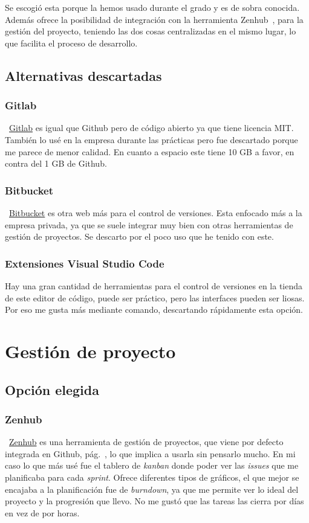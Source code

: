 Se escogió esta porque la hemos usado durante el grado y es de sobra conocida. Además ofrece la posibilidad de integración con la herramienta Zenhub~\pageref{zenhub}, para la gestión del proyecto, teniendo las dos cosas centralizadas en el mismo lugar, lo que facilita el proceso de desarrollo.

\subsection{Alternativas descartadas}

\subsubsection{Gitlab}
~\href{https://gitlab.com/}{Gitlab} es igual que Github pero de código abierto ya que tiene licencia MIT. También lo usé en la empresa durante las prácticas pero fue descartado porque me parece de menor calidad. En cuanto a espacio este tiene 10 GB a favor, en contra del 1 GB de Github.

\subsubsection{Bitbucket}
~\href{https://bitbucket.org/product//}{Bitbucket} es otra web más para el control de versiones. Esta enfocado más a la empresa privada, ya que se suele integrar muy bien con otras herramientas de gestión de proyectos. Se descarto por el poco uso que he tenido con este.

\subsubsection{Extensiones Visual Studio Code}
Hay una gran cantidad de herramientas para el control de versiones en la tienda de este editor de código, puede ser práctico, pero las interfaces pueden ser liosas. Por eso me gusta más mediante comando, descartando rápidamente esta opción.

\section{Gestión de proyecto}

\subsection{Opción elegida}

\subsubsection{Zenhub}\label{zenhub}
~\href{https://bitbucket.org/product//}{Zenhub} es una herramienta de gestión de proyectos, que viene por defecto integrada en Github, pág.~\pageref{github}, lo que implica a usarla sin pensarlo mucho. En mi caso lo que más usé fue el tablero de \emph{kanban} donde poder ver las \emph{issues} que me planificaba para cada \emph{sprint}. Ofrece diferentes tipos de gráficos, el que mejor se encajaba a la planificación fue de \emph{burndown}, ya que me permite ver lo ideal del proyecto y la progresión que llevo. No me gustó que las tareas las cierra por días en vez de por horas.

